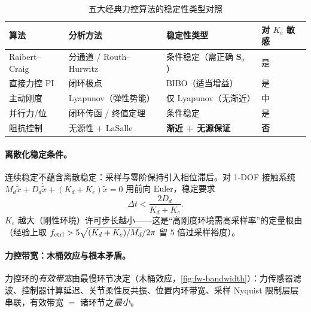 \begin{table}[H]\centering\small
\caption{五大经典力控算法的稳定性类型对照}
\label{tab:fw-stability}
\begin{tabular}{llll}
\toprule
算法 & 分析方法 & 稳定性类型 & 对 $K_e$ 敏感 \\
\midrule
Raibert--Craig & 分通道 / Routh--Hurwitz & 条件稳定（需正确 $\mathbf{S}_\sigma$） & 是 \\
直接力控 PI & 闭环极点 & BIBO（适当增益） & 是 \\
主动刚度 & Lyapunov（弹性势能） & 仅 Lyapunov（无渐近） & 中 \\
并行力/位 & 闭环传函 / 终值定理 & 条件稳定 & 是 \\
阻抗控制 & 无源性 + LaSalle & \textbf{渐近 + 无源保证} & \textbf{否} \\
\bottomrule
\end{tabular}
\end{table}

\paragraph{离散化稳定条件。}
连续稳定不蕴含离散稳定：采样与零阶保持引入相位滞后。对 1-DOF 接触系统 $M_d\ddot{\tilde x}+D_d\dot{\tilde x}+(K_d+K_e)\tilde x=0$ 用前向 Euler，稳定要求
\begin{equation}
  \Delta t<\frac{2D_d}{K_d+K_e}.
  \label{eq:fw-discrete}
\end{equation}
$K_e$ 越大（刚性环境）许可步长越小——这是“高刚度环境需高采样率”的定量根由（经验上取 $f_{\rm ctrl}>5\sqrt{(K_d+K_e)/M_d}/2\pi$ 留 $5$ 倍过采样裕度）。

\paragraph{力控带宽：木桶效应与根本矛盾。}
力控环的\emph{有效带宽}由最慢环节决定（木桶效应，\cref{fig:fw-bandwidth}）：力传感器滤波、控制器计算延迟、关节柔性反共振、位置内环带宽、采样 Nyquist 限制层层串联，有效带宽 $=$ 诸环节之\emph{最小}。

